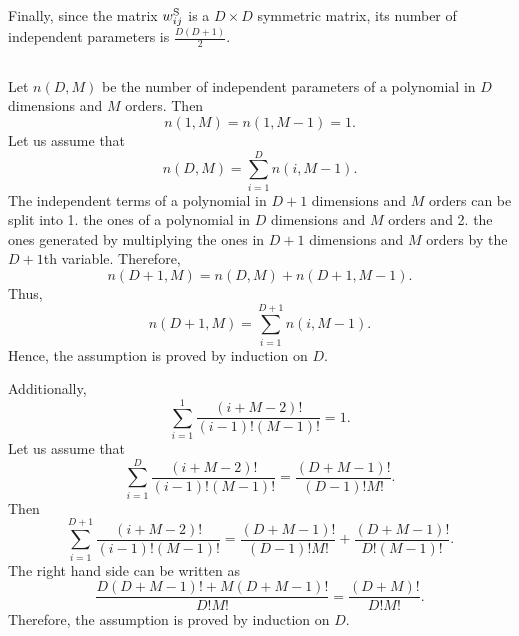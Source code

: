 Finally, since the matrix $w_{ij}^{\rm S}$ is a $D \times D$ symmetric matrix, its number of independent parameters is $\frac{D (D + 1)}{2}$.


\subsection{}
\label{1.15}
Let $n(D, M)$ be the number of independent parameters of a polynomial in $D$ dimensions and $M$ orders.
Then
%
\begin{equation}
n(1, M)
=
n(1, M - 1)
=
1.
\end{equation}
%
Let us assume that
%
\begin{equation}
n(D, M)
=
\sum_{i = 1}^{D}
n(i, M - 1).
\end{equation}
%
The independent terms of a polynomial in $D + 1$ dimensions and $M$ orders can be split into 1. the ones of a polynomial in $D$ dimensions and $M$ orders and 2. the ones generated by multiplying the ones in $D + 1$ dimensions and $M$ orders by the $D + 1$th variable.
Therefore,
%
\begin{equation}
n(D + 1, M)
=
n(D, M)
+
n(D + 1, M - 1).
\end{equation}
%
Thus,
%
\begin{equation}
n(D + 1, M)
=
\sum_{i = 1}^{D + 1}
n(i, M - 1).
\end{equation}
%
Hence, the assumption is proved by induction on $D$.

Additionally,
%
\begin{equation}
\sum_{i = 1}^{1}
\frac{(i + M - 2)!}{(i - 1)! (M - 1)!}
=
1.
\end{equation}
%
Let us assume that
%
\begin{equation}
\sum_{i = 1}^{D}
\frac{(i + M - 2)!}{(i - 1)! (M - 1)!}
=
\frac{(D + M - 1)!}{(D - 1)! M!}.
\end{equation}
%
Then
%
\begin{equation}
\sum_{i = 1}^{D + 1}
\frac{(i + M - 2)!}{(i - 1)! (M - 1)!}
=
\frac{(D + M - 1)!}{(D - 1)! M!}
+
\frac{(D + M - 1)!}{D! (M - 1)!}.
\end{equation}
%
The right hand side can be written as
%
\begin{equation}
\frac{D (D + M - 1)! + M (D + M - 1)!}{D! M!}
=
\frac{(D + M)!}{D! M!}.
\end{equation}
%
Therefore, the assumption is proved by induction on $D$.

